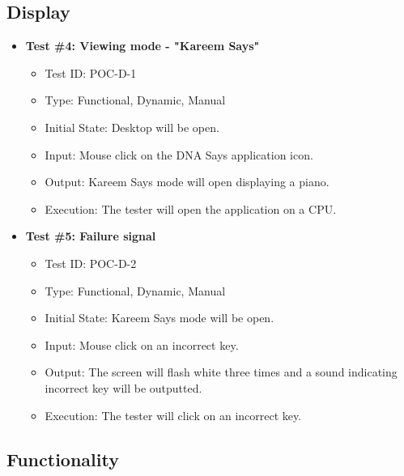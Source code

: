 \documentclass[12pt, titlepage]{article}
\begin{document}
\subsection{Display}

\begin{itemize}

\item \textbf{Test \#4: Viewing mode - "Kareem Says"}
\begin{itemize}
\item Test ID: POC-D-1
\item Type: Functional, Dynamic, Manual 		
\item Initial State: Desktop will be open. 					
\item Input: Mouse click on the DNA Says application icon.			
\item Output: Kareem Says mode will open displaying a piano.		
\item Execution: The tester will open the application on a CPU. 
\end{itemize}

\item \textbf{Test \#5: Failure signal}
\begin{itemize}
\item Test ID: POC-D-2
\item Type: Functional, Dynamic, Manual		
\item Initial State: Kareem Says mode will be open.					
\item Input: Mouse click on an incorrect key.					
\item Output: The screen will flash white three times and a sound indicating incorrect key will be outputted.  					
\item Execution: The tester will click on an incorrect key.  
\end{itemize}

\end{itemize}

\subsection{Functionality}
\end{document}
